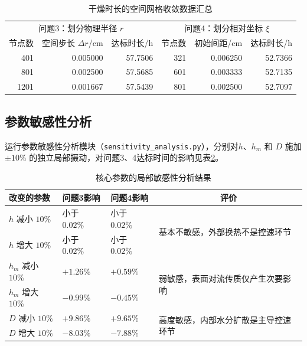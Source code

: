 \documentclass[12pt,a4paper,fontset=none]{ctexart}
\begin{document}
\begin{table}[H]
\centering
\caption{干燥时长的空间网格收敛数据汇总}\label{tab:grid}
\begin{tabular}{rrr@{\hspace{2.5em}}rrr}
\toprule
\multicolumn{3}{c}{问题3：划分物理半径 $r$} & \multicolumn{3}{c}{问题4：划分相对坐标 $\xi$}\\
节点数 & 空间步长 $\Delta r$/cm & 达标时长/h & 节点数 & 初始间距/cm & 达标时长/h\\
\midrule
401  & 0.005000 & 57.7506 & 321 & 0.006250 & 52.7366\\
801  & 0.002500 & 57.5685 & 601 & 0.003333 & 52.7135\\
1201 & 0.001667 & 57.5439 & 801 & 0.002500 & 52.7097\\
\bottomrule
\end{tabular}
\end{table}

\subsection{参数敏感性分析}
运行参数敏感性分析模块（\texttt{sensitivity\_analysis.py}），分别对$h$、$h_m$ 和 $D$ 施加 $\pm10\%$ 的独立局部摄动，对问题3、4达标时间的影响见表\ref{tab:sensitivity}。

\begin{table}[H]
\centering
\caption{核心参数的局部敏感性分析结果}\label{tab:sensitivity}
\small
\setlength{\tabcolsep}{4pt}
\renewcommand{\arraystretch}{1.20}
\begin{tabular}{>{\centering\arraybackslash}p{2.6cm}
>{\centering\arraybackslash}p{2.7cm}
>{\centering\arraybackslash}p{2.7cm}p{5.2cm}}
\toprule
改变的参数 & 问题3影响 & 问题4影响 & \multicolumn{1}{c}{评价}\\
\midrule
$h$ 减小 $10\%$ & 小于 $0.02\%$ & 小于 $0.02\%$ &
\multirow{2}{5.2cm}{基本不敏感，外部换热不是控速环节}\\
\cmidrule(lr){1-3}
$h$ 增大 $10\%$ & 小于 $0.02\%$ & 小于 $0.02\%$ &\\
\midrule
$h_m$ 减小 $10\%$ & $+1.26\%$ & $+0.59\%$ &
\multirow{2}{5.2cm}{弱敏感，表面对流传质仅产生次要影响}\\
\cmidrule(lr){1-3}
$h_m$ 增大 $10\%$ & $-0.99\%$ & $-0.45\%$ &\\
\midrule
$D$ 减小 $10\%$ & $+9.86\%$ & $+9.65\%$ &
\multirow{2}{5.2cm}{高度敏感，内部水分扩散是主导控速环节}\\
\cmidrule(lr){1-3}
$D$ 增大 $10\%$ & $-8.03\%$ & $-7.88\%$ &\\
\bottomrule
\end{tabular}
\end{table}
\end{document}
